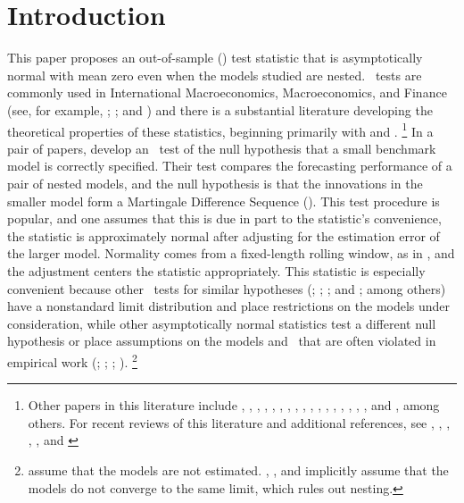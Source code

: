 \documentclass[12pt,fleqn]{article}
\begin{document}
\section{Introduction} This paper proposes an out-of-sample (\oos)
test statistic that is asymptotically normal with mean zero even when
the models studied are nested.
\oos\ tests are commonly used in International Macroeconomics,
Macroeconomics, and Finance (see, for example, \citealt{MeR:83};
\citealt{StW:03}; and \citealt{GoW:08}) and there is a substantial
literature developing the theoretical properties of these statistics,
beginning primarily with \citet{DiM:95} and
\citet{Wes:96}.%
\footnote{Other papers in this literature include
  \citet{WeM:98}, \citet{Mcc:98,Mcc:00},
  \citet{ClM:01,ClM:05-2,ClM:05,ClM:11b,ClM:12,ClM:12b},
  \citet{CCS:01}, \citet{CoS:02,CoS:04,CoS:07}, \citet{Whi:00},
  \citet{InK:04,InK:06}, \citet{Han:05}, \citet{Ros:05},
  \citet{ClW:06,ClW:07}, \citet{Ana:07}, \citet{GiR:09,GiR:10},
  \citet{HuW:10}, \citet{HLN:11}, \cite{InR:11}, \cite{Pin:11},
  \cite{RoS:11,RoS:11b}, and \citet{Cal:11}, among others.  For recent
  reviews of this literature and additional references, see
  \citet{McW:02}, \citet{CoS:06}, \citet{Wes:06}, \citet{ClM:11c},
  \citet{CoD:11}, and \citet{Gia:11}} %
In a pair of papers,
\citet{ClW:06,ClW:07} develop an \oos\ test of the null hypothesis
that a small benchmark model is correctly specified.  Their test
compares the forecasting performance of a pair of nested models, and
the null hypothesis is that the innovations in the smaller model form
a Martingale Difference Sequence (\mds).  This test procedure is popular, and
one assumes that this is due in part to the statistic's convenience,
the statistic is approximately normal after adjusting for the
estimation error of the larger model.  Normality comes from a
fixed-length rolling window, as in \citet{GiW:06}, and the adjustment
centers the statistic appropriately.  This statistic is especially
convenient because other \oos\ tests for similar hypotheses
(\citealt{CCS:01}; \citealt{ClM:01,ClM:05}; \citealt{CoS:02,CoS:04};
and \citealt{Mcc:07}; among others) have a nonstandard limit
distribution and place restrictions on the models under consideration,
while other asymptotically normal statistics test a different null
hypothesis \citep{GiW:06} or place assumptions on the models and \dgp\
that are often violated in empirical work (\citealt{DiM:95};
\citealt{Wes:96}; \citealt{WeM:98};
\citealt{Mcc:00}).%
\footnote{\citet{DiM:95} assume that the models are
  not estimated. \citet{Wes:96}, \citet{WeM:98}, and \citet{Mcc:00}
  implicitly assume that the models do not converge to the same limit,
  which rules out nesting.} %
\end{document}
